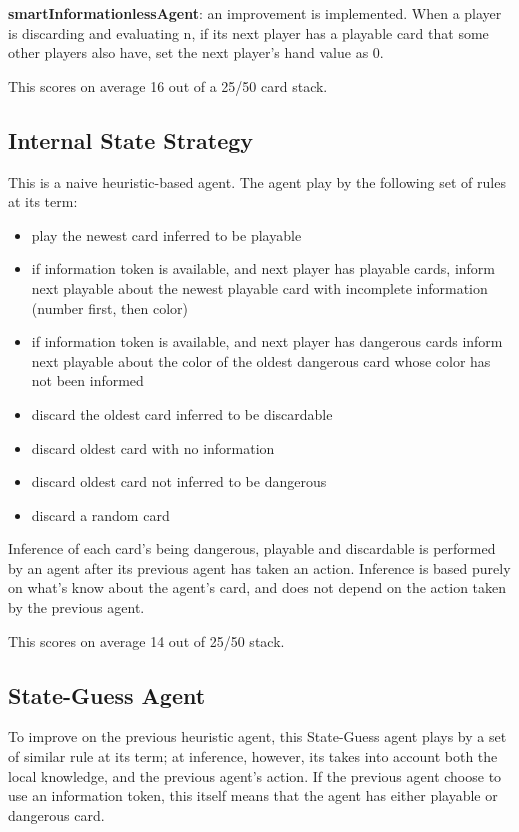 \documentclass[12pt]{article}
\begin{document}
\textbf{smartInformationlessAgent}: an improvement is implemented. When a player is discarding and evaluating n, if its next player has a playable card that some other players also have, set the next player's hand value as 0. 

This scores on average 16 out of a 25/50 card stack.

\subsection{Internal State Strategy}
This is a naive heuristic-based agent. The agent play by the following set of rules at its term:
\begin{itemize}
 \item play the newest card inferred to be playable
 \item if information token is available, and next player has playable cards, inform next playable about the newest playable card with incomplete information (number first, then color)
 \item if information token is available, and next player has dangerous cards inform next playable about the color of the oldest dangerous card whose color has not been informed
 \item discard the oldest card inferred to be discardable
 \item discard oldest card with no information
 \item discard oldest card not inferred to be dangerous
 \item discard a random card
\end{itemize}

Inference of each card's being dangerous, playable and discardable is performed by an agent after its previous agent has taken an action. Inference is based purely on what's know about the agent's card, and does not depend on the action taken by the previous agent.

This scores on average 14 out of 25/50 stack.

\subsection{State-Guess Agent}
To improve on the previous heuristic agent, this State-Guess agent plays by a set of similar rule at its term; at inference, however, its takes into account both the local knowledge, and the previous agent's action. If the previous agent choose to use an information token, this itself means that the agent has either playable or dangerous card.
\end{document}
